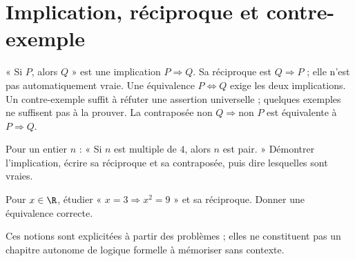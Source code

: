 \section{Implication, réciproque et contre-exemple}
\begin{keypoint}
« Si $P$, alors $Q$ » est une implication $P\Rightarrow Q$. Sa réciproque est $Q\Rightarrow P$ ; elle n'est pas automatiquement vraie. Une équivalence $P\iff Q$ exige les deux implications.
Un contre-exemple suffit à réfuter une assertion universelle ; quelques exemples ne suffisent pas à la prouver. La contraposée $\text{non }Q\Rightarrow\text{non }P$ est équivalente à $P\Rightarrow Q$.
\end{keypoint}
\begin{example}Pour un entier $n$ : « Si $n$ est multiple de $4$, alors $n$ est pair. » Démontrer l'implication, écrire sa réciproque et sa contraposée, puis dire lesquelles sont vraies.\end{example}
\begin{example}Pour $x\in\R$, étudier « $x=3\Rightarrow x^2=9$ » et sa réciproque. Donner une équivalence correcte.\end{example}
\begin{teachernote}Ces notions sont explicitées à partir des problèmes ; elles ne constituent pas un chapitre autonome de logique formelle à mémoriser sans contexte.\end{teachernote}

